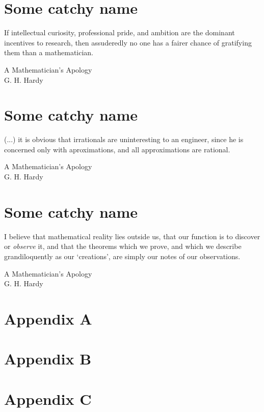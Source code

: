 \documentclass[12pt,letterpaper]{book}
\theoremstyle{definition} \newtheorem{definition}{Definición}[section]
\theoremstyle{plain} \newtheorem{theorem}{Teorema}[section]
\theoremstyle{plain} \newtheorem{lemma}{Lema}[section]
\theoremstyle{plain} \newtheorem{proposition}[theorem]{Proposici\'on}
\theoremstyle{plain} \newtheorem{corollary}[theorem]{Corolario}
\theoremstyle{plain} \newtheorem{remark}[theorem]{Comentario}
\begin{document}
\chapter{Some catchy name}
\epigraph{If intellectual curiosity, professional pride, and ambition are the dominant incentives to research, then assuderedly no one has a fairer chance of gratifying them than a mathematician.}{A Mathematician's Apology \\ G. H. Hardy}


\chapter{Some catchy name}
\epigraph{(...) it is obvious that irrationals are uninteresting to an engineer, since he is concerned only with aproximations, and all approximations are rational.}{A Mathematician's Apology \\ G. H. Hardy}


\chapter{Some catchy name}
\epigraph{I believe that mathematical reality lies outside us, that our function is to discover or \emph{observe} it, and that the theorems which we prove, and which we describe grandiloquently as our `creations', are simply our notes of our observations.}{A Mathematician's Apology \\ G. H. Hardy}

\backmatter
\appendix
\chapter{Appendix A}

\chapter{Appendix B}

\chapter{Appendix C}

\cleardoublepage
{}


\cleardoublepage
\printindex
\end{document}
